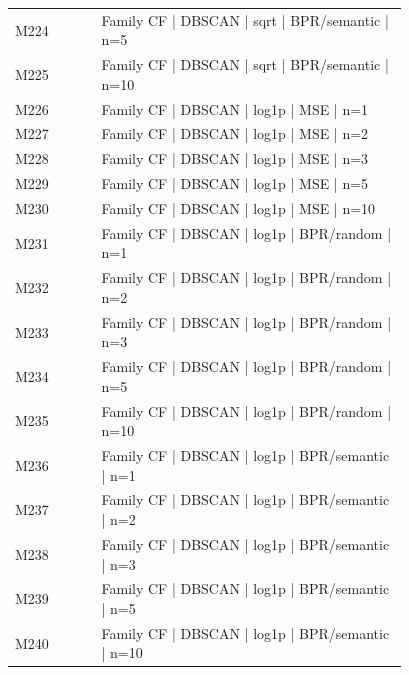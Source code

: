 \begin{longtable}{lp{0.78\linewidth}}
M224 & Family CF | DBSCAN | sqrt | BPR/semantic | n=5 \\
M225 & Family CF | DBSCAN | sqrt | BPR/semantic | n=10 \\
M226 & Family CF | DBSCAN | log1p | MSE | n=1 \\
M227 & Family CF | DBSCAN | log1p | MSE | n=2 \\
M228 & Family CF | DBSCAN | log1p | MSE | n=3 \\
M229 & Family CF | DBSCAN | log1p | MSE | n=5 \\
M230 & Family CF | DBSCAN | log1p | MSE | n=10 \\
M231 & Family CF | DBSCAN | log1p | BPR/random | n=1 \\
M232 & Family CF | DBSCAN | log1p | BPR/random | n=2 \\
M233 & Family CF | DBSCAN | log1p | BPR/random | n=3 \\
M234 & Family CF | DBSCAN | log1p | BPR/random | n=5 \\
M235 & Family CF | DBSCAN | log1p | BPR/random | n=10 \\
M236 & Family CF | DBSCAN | log1p | BPR/semantic | n=1 \\
M237 & Family CF | DBSCAN | log1p | BPR/semantic | n=2 \\
M238 & Family CF | DBSCAN | log1p | BPR/semantic | n=3 \\
M239 & Family CF | DBSCAN | log1p | BPR/semantic | n=5 \\
M240 & Family CF | DBSCAN | log1p | BPR/semantic | n=10 \\
\end{longtable}
